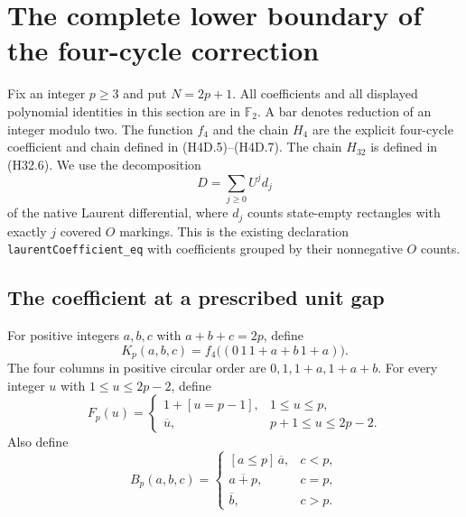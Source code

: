 \documentclass[11pt,oneside]{report}
\theoremstyle{definition}
\numberwithin{equation}{section}
\newcommand{\decl}[1]{\textnormal{\nolinkurl{#1}}}
\begin{document}
\section{The complete lower boundary of the four-cycle correction}
\label{J21:sec:h4-lower-boundary}

Fix an integer $p\geq3$ and put $N=2p+1$.
All coefficients and all displayed polynomial identities in this section
are in $\mathbb F _2$. A bar denotes reduction of an integer modulo two.
The function $f_4$ and the chain $H_4$ are the explicit four-cycle
coefficient and chain defined in (H4D.5)--(H4D.7).
The chain $H_{32}$ is defined in (H32.6).
We use the decomposition
\[
                         D=\sum_{j\geq0}U^j d_j
\]
of the native Laurent differential, where $d_j$ counts state-empty
rectangles with exactly $j$ covered $O$ markings.
This is the existing declaration
\decl{laurentCoefficient_eq} with coefficients grouped by their
nonnegative $O$ counts.

\subsection{The coefficient at a prescribed unit gap}

For positive integers $a,b,c$ with $a+b+c=2p$, define
\[
 K_p(a,b,c)=
 f_4\bigl((0\,1\,1+a+b\,1+a)\bigr).
 \tag{H4L.1}
\]
The four columns in positive circular order are
$0,1,1+a,1+a+b$.
For every integer $u$ with $1\leq u\leq2p-2$, define
\[
 F_p(u)=
 \begin{cases}
  1+[u=p-1],&1\leq u\leq p,\\
  \overline u,&p+1\leq u\leq2p-2.
 \end{cases}
 \tag{H4L.2}
\]
Also define
\[
 B_p(a,b,c)=
 \begin{cases}
  [a\leq p]\,\overline a,&c<p,\\
  \overline{a+p},&c=p,\\
  \overline b,&c>p.
 \end{cases}
 \tag{H4L.3}
\]
\end{document}
